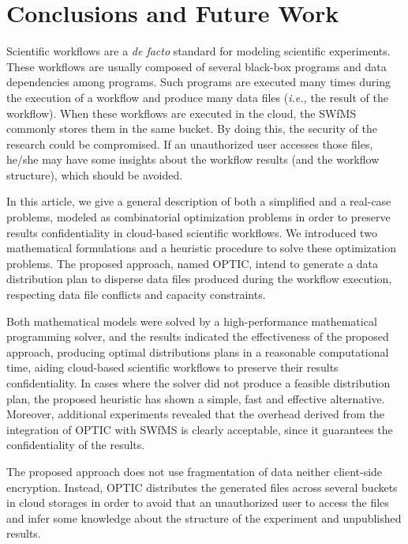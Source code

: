 \section{Conclusions and Future Work}

Scientific workflows are a \textit{de facto} standard for modeling scientific experiments. These workflows are usually composed of several black-box programs and data dependencies among programs. Such programs are executed many times during the execution of a workflow and produce many data files (\textit{i.e.,} the result of the workflow). When these workflows are executed in the cloud, the SWfMS commonly stores them in the same bucket. By doing this, the security of the research could be compromised. If an unauthorized user accesses those files, he/she may have some insights about the workflow results (and the workflow structure), which should be avoided.

In this article, we give a general description of both a simplified and a real-case problems, modeled as combinatorial optimization problems in order to preserve results confidentiality in cloud-based scientific workflows. We introduced two mathematical formulations and a heuristic procedure to solve these optimization problems. The proposed approach, named OPTIC, intend to generate a data distribution plan to disperse data files produced during the workflow execution, respecting data file conflicts and capacity constraints. 

Both mathematical models were solved by a high-performance mathematical programming solver, and the results indicated the effectiveness of the proposed approach, producing optimal distributions plans in a reasonable computational time, aiding cloud-based scientific workflows to preserve their results confidentiality. In cases where the solver did not produce a feasible distribution plan, the proposed heuristic has shown a simple, fast and effective alternative. Moreover, additional experiments revealed that the overhead derived from the integration of OPTIC with SWfMS is clearly acceptable, since it guarantees the confidentiality of the results.          

The proposed approach does not use fragmentation of data neither client-side encryption. Instead, OPTIC distributes the generated files across several buckets in cloud storages in order to avoid that an unauthorized user to access the files and infer some knowledge about the structure of the experiment and unpublished results.


